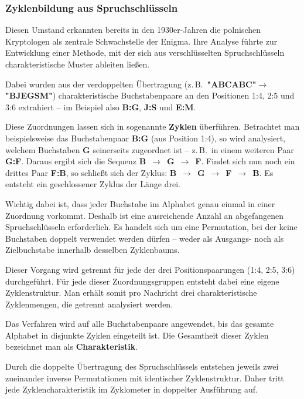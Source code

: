 \documentclass[12pt, ngerman, a4paper, numbers=noenddot]{article}
\begin{document}
\subsubsection{Zyklenbildung aus Spruchschlüsseln}
Diesen Umstand erkannten bereits in den 1930er-Jahren die polnischen Kryptologen als zentrale Schwachstelle der Enigma. Ihre Analyse führte zur Entwicklung einer Methode, mit der sich aus verschlüsselten Spruchschlüsseln charakteristische Muster ableiten ließen. 

Dabei wurden aus der verdoppelten Übertragung (z.\,B.\ \textbf{"ABCABC"}\newline $\rightarrow$ \textbf{"BJEGSM"}) charakteristische Buchstabenpaare an den Positionen 1:4, 2:5 und 3:6 extrahiert – im Beispiel also \textbf{B:G}, \textbf{J:S} und \textbf{E:M}.

Diese Zuordnungen lassen sich in sogenannte \textbf{Zyklen} überführen. Betrachtet man beispielsweise das Buchstabenpaar \textbf{B:G} (aus Position 1:4), so wird analysiert, welchem Buchstaben \textbf{G} seinerseits zugeordnet ist – z.\,B.\ in einem weiteren Paar \textbf{G:F}. Daraus ergibt sich die Sequenz \textbf{B}~$\rightarrow$~\textbf{G}~$\rightarrow$~\textbf{F}. Findet sich nun noch ein drittes Paar \textbf{F:B}, so schließt sich der Zyklus: \textbf{B}~$\rightarrow$~\textbf{G}~$\rightarrow$~\textbf{F}~$\rightarrow$~\textbf{B}. Es entsteht ein geschlossener Zyklus der Länge drei.

Wichtig dabei ist, dass jeder Buchstabe im Alphabet genau einmal in einer Zuordnung vorkommt. Deshalb ist eine ausreichende Anzahl an abgefangenen Spruchschlüsseln erforderlich. Es handelt sich um eine Permutation, bei der keine Buchstaben doppelt verwendet werden dürfen – weder als Ausgangs- noch als Zielbuchstabe innerhalb desselben Zyklenbaums.


Dieser Vorgang wird getrennt für jede der drei Positionspaarungen (1:4, 2:5, 3:6) durchgeführt. Für jede dieser Zuordnungsgruppen entsteht dabei eine eigene Zyklenstruktur. Man erhält somit pro Nachricht drei charakteristische Zyklenmengen, die getrennt analysiert werden.

Das Verfahren wird auf alle Buchstabenpaare angewendet, bis das gesamte Alphabet in disjunkte Zyklen eingeteilt ist. Die Gesamtheit dieser Zyklen bezeichnet man als \textbf{Charakteristik}.

Durch die doppelte Übertragung des Spruchschlüssels entstehen jeweils zwei zueinander inverse Permutationen mit identischer Zyklenstruktur. Daher tritt jede Zyklencharakteristik im Zyklometer in doppelter Ausführung auf.
\end{document}
